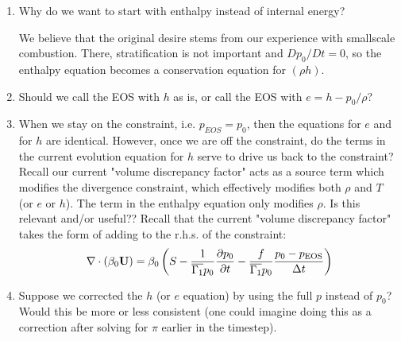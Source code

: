\begin{enumerate}
\item Why do we want to start with enthalpy instead of internal energy?

   We believe that the original desire stems from our experience with smallscale 
   combustion.  There, stratification is not important and $Dp_0/Dt = 0$, so
   the enthalpy equation becomes a conservation equation for $(\rho h)$.

\item Should we call the EOS with $h$ as is, or call the EOS with $e = h - p_0 / \rho$?

\item When we stay on the constraint, i.e. $p_{EOS} = p_0$, then the equations for $e$ and
for $h$ are identical.   However, once we are off the constraint, do the terms in the
current evolution equation for $h$ serve to drive us back to the constraint?  Recall
our current "volume discrepancy factor" acts as a source term which modifies the
divergence constraint, which effectively modifies both $\rho$ and $T$ (or $e$ or $h$).
The term in the enthalpy equation only modifies $\rho.$  Is this relevant and/or useful??
Recall that the current "volume discrepancy factor" takes the form of adding 
to the r.h.s. of the constraint:
\begin{equation}
\nabla \cdot(\beta_0{\bf U}) = \beta_0\left(S-\frac{1}{\overline{\Gamma_1} p_0}
       \frac{\partial p_0}{\partial t} - \frac{f}{\overline{\Gamma_1} p_0}
       \frac{p_0-p_\text{EOS}}{\Delta t}\right) 
\end{equation}


\item Suppose we corrected the $h$ (or $e$ equation) by using the full $p$ instead
of $p_0$?  Would this be more or less consistent (one could imagine doing this as a 
correction after solving for $\pi$ earlier in the timestep). 

%
%
%

\end{enumerate}







